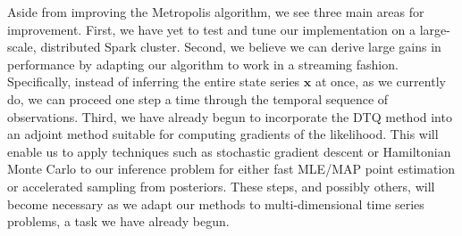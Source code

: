 \documentclass[wcp]{jmlr}
\begin{document}
Aside from improving the Metropolis algorithm, we see three main
areas for improvement.  First, we have yet to test and tune our implementation
on a large-scale, distributed Spark cluster. 
Second, we believe we can derive large gains in performance by
adapting our algorithm to work in a streaming fashion.  Specifically,
instead of inferring the entire state series $\mathbf{x}$ at once, as
we currently do, we can proceed one step a time through the temporal
sequence of observations.  Third, we have already begun to incorporate
the DTQ method into an adjoint method suitable for computing gradients of the
likelihood.  This will enable us to apply techniques such as
stochastic gradient descent or Hamiltonian Monte Carlo to our
inference problem for either fast MLE/MAP point estimation or
accelerated sampling from posteriors.  These steps, and possibly
others, will become  necessary as we adapt our methods to
multi-dimensional time series problems, a task we have already begun.



\end{document}
